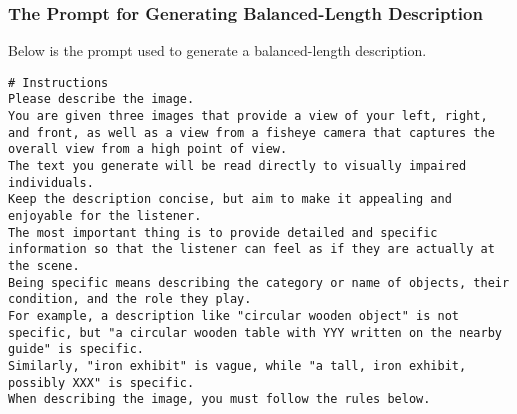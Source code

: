 \subsubsection{The Prompt for Generating Balanced-Length Description}
Below is the prompt used to generate a balanced-length description.
\begin{lstlisting}
# Instructions  
Please describe the image.  
You are given three images that provide a view of your left, right, and front, as well as a view from a fisheye camera that captures the overall view from a high point of view.
The text you generate will be read directly to visually impaired individuals.  
Keep the description concise, but aim to make it appealing and enjoyable for the listener.  
The most important thing is to provide detailed and specific information so that the listener can feel as if they are actually at the scene.  
Being specific means describing the category or name of objects, their condition, and the role they play.  
For example, a description like "circular wooden object" is not specific, but "a circular wooden table with YYY written on the nearby guide" is specific.  
Similarly, "iron exhibit" is vague, while "a tall, iron exhibit, possibly XXX" is specific.  
When describing the image, you must follow the rules below.


\end{lstlisting}
